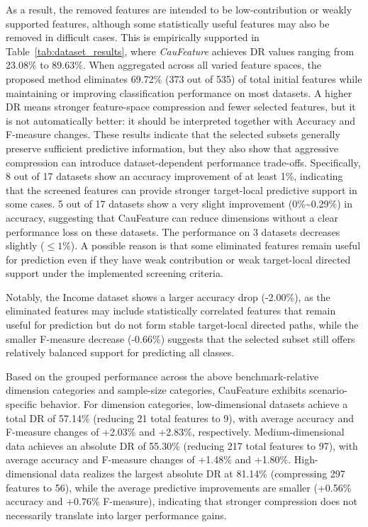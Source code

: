 \documentclass[journal]{IEEEtran}
\begin{document}
As a result, the removed features are intended to be low-contribution or weakly supported features, although some statistically useful features may also be removed in difficult cases. This is empirically supported in Table~\ref{tab:dataset_results}, where \textit{CauFeature} achieves DR values ranging from 23.08\% to 89.63\%. When aggregated across all varied feature spaces, the proposed method eliminates 69.72\% (373 out of 535) of total initial features while maintaining or improving classification performance on most datasets. A higher DR means stronger feature-space compression and fewer selected features, but it is not automatically better: it should be interpreted together with Accuracy and F-measure changes. These results indicate that the selected subsets generally preserve sufficient predictive information, but they also show that aggressive compression can introduce dataset-dependent performance trade-offs.
Specifically, 8 out of 17 datasets show an accuracy improvement of at least 1\%, indicating that the screened features can provide stronger target-local predictive support in some cases. 5 out of 17 datasets show a very slight improvement (0\%\textasciitilde0.29\%) in accuracy, suggesting that CauFeature can reduce dimensions without a clear performance loss on these datasets. The performance on 3 datasets decreases slightly ($\leq\!1\%$). A possible reason is that some eliminated features remain useful for prediction even if they have weak contribution or weak target-local directed support under the implemented screening criteria.%

Notably, the Income dataset shows a larger accuracy drop (-2.00\%), as the eliminated features may include statistically correlated features that remain useful for prediction but do not form stable target-local directed paths, while the smaller F-measure decrease (-0.66\%) suggests that the selected subset still offers relatively balanced support for predicting all classes.

Based on the grouped performance across the above benchmark-relative dimension categories and sample-size categories, CauFeature exhibits scenario-specific behavior. For dimension categories, low-dimensional datasets achieve a total DR of 57.14\% (reducing 21 total features to 9), with average accuracy and F-measure changes of +2.03\% and +2.83\%, respectively. Medium-dimensional data achieves an absolute DR of 55.30\% (reducing 217 total features to 97), with average accuracy and F-measure changes of +1.48\% and +1.80\%. High-dimensional data realizes the largest absolute DR at 81.14\% (compressing 297 features to 56), while the average predictive improvements are smaller (+0.56\% accuracy and +0.76\% F-measure), indicating that stronger compression does not necessarily translate into larger performance gains.
\end{document}
